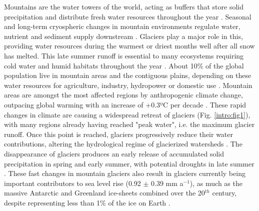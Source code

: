Mountains are the water towers of the world, acting as buffers that store solid precipitation and distribute fresh water resources throughout the year \citep{immerzeel_importance_2020}. Seasonal and long-term cryospheric changes in mountain environments regulate water, nutrient and sediment supply downstream \citep{huss_toward_2017}. Glaciers play a major role in this, providing water resources during the warmest or driest months well after all snow has melted. This late summer runoff is essential to many ecosystems requiring cold water and humid habitats throughout the year \citep{cauvy-fraunie_global_2019, carlson_monitoring_2020}. About 10\% of the global population live in mountain areas and the contiguous plains, depending on these water resources for agriculture, industry, hydropower or domestic use \citep{huss_global-scale_2018,farinotti_large_2019}. Mountain areas are amongst the most affected regions by anthropogenic climate change, outpacing global warming  with an increase of +0.3ºC per decade \citep{ipcc_climate_2018}. These rapid changes in climate are causing a widespread retreat of glaciers (Fig. \ref{intro:fig1}), with many regions already having reached "peak water", i.e. the maximum glacier runoff. Once this point is reached, glaciers progressively reduce their water contributions, altering the hydrological regime of glacierized watersheds \citep{huss_global-scale_2018}. The disappearance of glaciers produces an early release of accumulated solid precipitation in spring and early summer, with potential droughts in late summer \citep{brunner_future_2019}. These fast changes in mountain glaciers also result in glaciers currently being important contributors to sea level rise (0.92 $\pm$ 0.39 mm a$^{-1}$), as much as the massive Antarctic and Greenland ice-sheets combined over the 20$^{th}$ century, despite representing less than 1\% of the ice on Earth \citep{zemp_global_2019, hock_glaciermip_2019}. 

